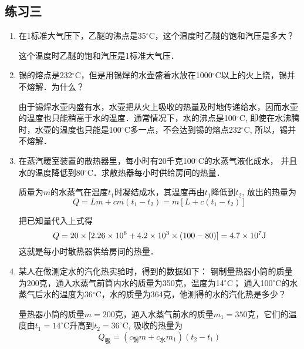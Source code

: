 \subsection{练习三}
\begin{enumerate}
 \item 在1标准大气压下，乙醚的沸点是35$^\circ$C，这个温度时乙醚的饱和汽压是多大？
    
 \begin{solution}
这个温度时乙醚的饱和汽压是1标准大气压．
 \end{solution}
  \item 锡的熔点是232$^\circ$C，但是用锡焊的水壶盛着水放在1000$^\circ$C以上的火上烧，锡并不熔解．为什么？
    
  \begin{solution}
    由于锡焊水壶内盛有水，水壶把从火上吸收的热量及时地传递给水，因而水壶的温度也只能稍高于水的温度．通常情况下，水的沸点是100$^\circ$C, 即使在水沸腾时，水壶的温度也只能是100$^\circ$C多一点，不会达到锡的熔点232$^\circ$C, 所以，锡并不熔解．
  \end{solution}
  \item 在蒸汽暖室装置的散热器里，每小时有20千克100$^\circ$C的水蒸气液化成水，
    并且水的温度降低到80$^\circ$C．求散热器每小时供给房间的热量．
    
    \begin{solution}
质量为$m$的水蒸气在温度$t_1$时凝结成水，其温度再由$t_1$降低到$t_2$, 放出的热量为
\[Q=Lm+cm (t_1-t_2) =m [L+c (t_1-t_2) ]\]

把已知量代入上式得
\[Q=20\times[2. 26\times10^6+4.2\times10^3\times(100-80)]
=4.7\times10^7{\rm J}\]
这就是每小时散热器供给房间的热量． 
    \end{solution}
    \item 某人在做测定水的汽化热实验时，得到的数据如下：
   钢制量热器小筒的质量为200克，通入水蒸气前筒内水的质量为350克，温度为14$^\circ$C；
    通入100$^\circ$C的水蒸气后水的温度为36$^\circ$C，水的质量为364克，他测得的水的汽化热是多少？
    
    \begin{solution}
量热器小筒的质量$m=200$克，通入水蒸气前水的质量$m_1=350$克，它们的温度由$t_1=14^{\circ}$C升高到$t_2=36^{\circ}$C, 吸收的热量为
\[Q_{\text{吸}}= (c_{\text{铜}}m+c_{\text{水}}m_1) (t_2-t_1)\]


\end{solution}
\end{enumerate}

